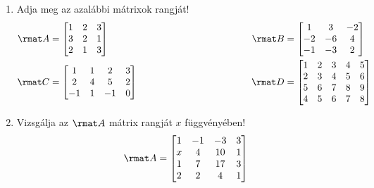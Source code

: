 \documentclass[a4paper, 12pt]{scrartcl}
\begin{document}
\begin{enumerate}
  \item Adja meg az azalábbi mátrixok rangját!
        \begin{alignat*}{9}
          \rmat A & =
          \begin{bmatrix}
            1 & 2 & 3 \\
            3 & 2 & 1 \\
            2 & 1 & 3
          \end{bmatrix}
          \hspace{5cm}
                  & \rmat B & =
          \begin{bmatrix}
            1  & 3  & -2 \\
            -2 & -6 & 4  \\
            -1 & -3 & 2
          \end{bmatrix}
          \\
          \rmat C & =
          \begin{bmatrix}
            1  & 1 & 2  & 3 \\
            2  & 4 & 5  & 2 \\
            -1 & 1 & -1 & 0
          \end{bmatrix}
          \qquad
                  & \rmat D & =
          \begin{bmatrix}
            1 & 2 & 3 & 4 & 5 \\
            2 & 3 & 4 & 5 & 6 \\
            5 & 6 & 7 & 8 & 9 \\
            4 & 5 & 6 & 7 & 8
          \end{bmatrix}
        \end{alignat*}


  \item Vizsgálja az $\rmat A$ mátrix rangját $x$ függvényében!
        $$
          \rmat A = \begin{bmatrix}
            1 & -1 & -3 & 3 \\
            x & 4  & 10 & 1 \\
            1 & 7  & 17 & 3 \\
            2 & 2  & 4  & 1
          \end{bmatrix}
        $$


\end{enumerate}
\end{document}
